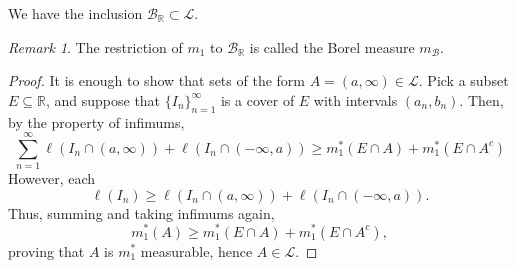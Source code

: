 \documentclass[11pt]{article}
\newcommand{\R}{\mathbb{R}}
\renewcommand{\L}{\mathcal{L}}
\theoremstyle{definition}
\theoremstyle{remark}
\newtheorem*{remark}{Remark}
\numberwithin{equation}{section}
\begin{document}
    \begin{theorem}
        We have the inclusion $\mathcal{B}_\R \subset \L$.
        
        \begin{remark}
            The restriction of $m_1$ to $\mathcal{B}_\R$ is called the Borel measure
            $m_{\mathcal{B}}$.
        \end{remark}
    \end{theorem}
    \begin{proof}
        It is enough to show that sets of the form $A = (a, \infty) \in \L$. Pick a
        subset $E \subseteq \R$, and suppose that $\{I_n\}_{n = 1}^\infty$ is a cover
        of $E$ with intervals $(a_n, b_n)$. Then, by the property of infimums, \[
            \sum_{n = 1}^\infty \ell(I_n \cap (a, \infty)) + \ell(I_n \cap (-\infty,
            a)) \geq m_1^*(E \cap A) + m_1^*(E \cap A^c)
        \] However, each \[
            \ell(I_n) \geq \ell(I_n \cap (a, \infty)) + \ell(I_n \cap (-\infty, a)).
        \] Thus, summing and taking infimums again, \[
            m_1^*(A) \geq m_1^*(E \cap A) + m_1^*(E \cap A^c),
        \] proving that $A$ is $m_1^*$ measurable, hence $A \in \L$.
    \end{proof}
\end{document}

